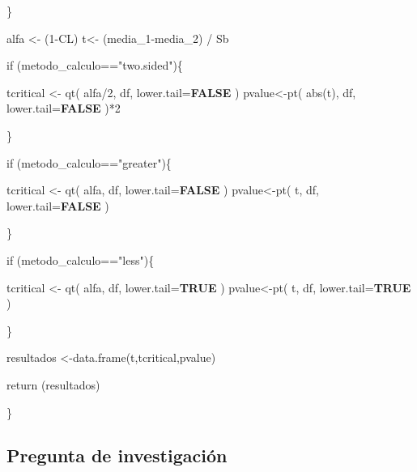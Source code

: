 \documentclass[
]{article}
\newenvironment{Shaded}{\begin{snugshade}}{\end{snugshade}}
\newcommand{\AttributeTok}[1]{\textcolor[rgb]{0.80,0.80,0.80}{#1}}
\newcommand{\ConstantTok}[1]{\textcolor[rgb]{0.86,0.64,0.64}{\textbf{#1}}}
\newcommand{\ControlFlowTok}[1]{\textcolor[rgb]{0.94,0.87,0.69}{#1}}
\newcommand{\DecValTok}[1]{\textcolor[rgb]{0.86,0.86,0.80}{#1}}
\newcommand{\FunctionTok}[1]{\textcolor[rgb]{0.94,0.94,0.56}{#1}}
\newcommand{\NormalTok}[1]{\textcolor[rgb]{0.80,0.80,0.80}{#1}}
\newcommand{\OtherTok}[1]{\textcolor[rgb]{0.94,0.94,0.56}{#1}}
\newcommand{\SpecialCharTok}[1]{\textcolor[rgb]{0.86,0.64,0.64}{#1}}
\newcommand{\StringTok}[1]{\textcolor[rgb]{0.80,0.58,0.58}{#1}}
\begin{document}
\begin{Shaded}
\begin{Highlighting}[]
\NormalTok{  \}}

\NormalTok{  alfa }\OtherTok{\textless{}{-}}\NormalTok{ (}\DecValTok{1}\SpecialCharTok{{-}}\NormalTok{CL)}
\NormalTok{  t}\OtherTok{\textless{}{-}}\NormalTok{ (media\_1}\SpecialCharTok{{-}}\NormalTok{media\_2) }\SpecialCharTok{/}\NormalTok{ Sb}
  
  
  \ControlFlowTok{if}\NormalTok{ (metodo\_calculo}\SpecialCharTok{==}\StringTok{"two.sided"}\NormalTok{)\{}
  
\NormalTok{      tcritical }\OtherTok{\textless{}{-}} \FunctionTok{qt}\NormalTok{( alfa}\SpecialCharTok{/}\DecValTok{2}\NormalTok{, df, }\AttributeTok{lower.tail=}\ConstantTok{FALSE}\NormalTok{ )}
\NormalTok{      pvalue}\OtherTok{\textless{}{-}}\FunctionTok{pt}\NormalTok{( }\FunctionTok{abs}\NormalTok{(t), df, }\AttributeTok{lower.tail=}\ConstantTok{FALSE}\NormalTok{ )}\SpecialCharTok{*}\DecValTok{2}
      
\NormalTok{  \}}
  
  \ControlFlowTok{if}\NormalTok{ (metodo\_calculo}\SpecialCharTok{==}\StringTok{"greater"}\NormalTok{)\{}
  
\NormalTok{      tcritical }\OtherTok{\textless{}{-}} \FunctionTok{qt}\NormalTok{( alfa, df, }\AttributeTok{lower.tail=}\ConstantTok{FALSE}\NormalTok{ )}
\NormalTok{      pvalue}\OtherTok{\textless{}{-}}\FunctionTok{pt}\NormalTok{( t, df, }\AttributeTok{lower.tail=}\ConstantTok{FALSE}\NormalTok{ )  }
      
\NormalTok{  \}}
  
  \ControlFlowTok{if}\NormalTok{ (metodo\_calculo}\SpecialCharTok{==}\StringTok{"less"}\NormalTok{)\{}
  
\NormalTok{      tcritical }\OtherTok{\textless{}{-}} \FunctionTok{qt}\NormalTok{( alfa, df, }\AttributeTok{lower.tail=}\ConstantTok{TRUE}\NormalTok{ )}
\NormalTok{      pvalue}\OtherTok{\textless{}{-}}\FunctionTok{pt}\NormalTok{( t, df, }\AttributeTok{lower.tail=}\ConstantTok{TRUE}\NormalTok{ )}
        
\NormalTok{  \}}
  
  
\NormalTok{  resultados }\OtherTok{\textless{}{-}}\FunctionTok{data.frame}\NormalTok{(t,tcritical,pvalue)}

  \FunctionTok{return}\NormalTok{ (resultados)}

\NormalTok{\}}
\end{Highlighting}
\end{Shaded}

\hypertarget{pregunta-de-investigaciuxf3n}{%
\subsection{Pregunta de
investigación}\label{pregunta-de-investigaciuxf3n}}
\end{document}

